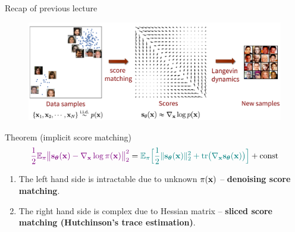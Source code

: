 

\usepackage{tikz}

\usetikzlibrary{arrows,shapes,positioning,shadows,trees}

\begin{frame}
\titlepage
\end{frame}
\begin{frame}{Recap of previous lecture}
	\begin{figure}
		\centering
		\includegraphics[width=0.75\linewidth]{figs/smld}
	\end{figure}
	\vspace{-0.3cm} 
	\begin{block}{Theorem (implicit score matching)}
		\vspace{-0.6cm}
		\[
		{\color{violet}\frac{1}{2} \mathbb{E}_{\pi}\bigl\| \mathbf{s}_{\boldsymbol{\theta}}(\mathbf{x}) - \nabla_{\mathbf{x}} \log \pi(\mathbf{x}) \bigr\|^2_2} = {\color{teal}\mathbb{E}_{\pi}\Bigr[ \frac{1}{2}\| \mathbf{s}_{\boldsymbol{\theta}}(\mathbf{x}) \|_2^2 + \text{tr}\bigl(\nabla_{\mathbf{x}} \mathbf{s}_{\boldsymbol{\theta}}(\mathbf{x})\bigr) \Bigr]} + \text{const}
		\]
	\end{block}
	\vspace{-0.5cm}
	\begin{enumerate}
		\item {\color{violet}The left hand side} is intractable due to unknown $\pi(\mathbf{x})$ -- \textbf{denoising score matching}. 
		\item {\color{teal}The right hand side} is complex due to Hessian matrix -- \textbf{sliced score matching (Hutchinson's trace estimation)}.
	\end{enumerate}
\end{frame}
